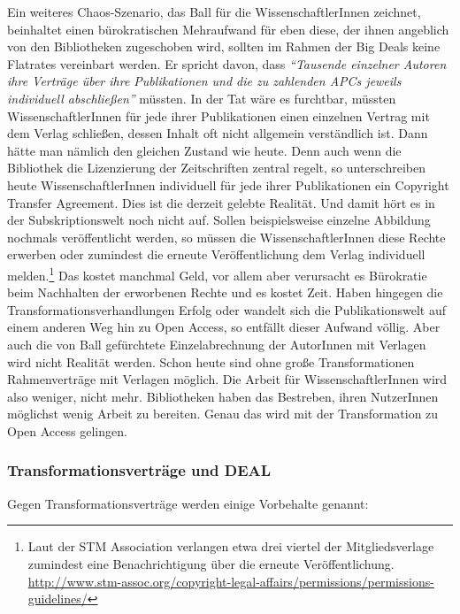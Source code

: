 \documentclass[a4paper,
fontsize=11pt,
oneside,
numbers=noperiodatend,
parskip=half-,
bibliography=totoc,
final
]{scrartcl}
\begin{document}
Ein weiteres Chaos-Szenario, das Ball für die WissenschaftlerInnen
zeichnet, beinhaltet einen bürokratischen Mehraufwand für eben diese,
der ihnen angeblich von den Bibliotheken zugeschoben wird, sollten im
Rahmen der Big Deals keine Flatrates vereinbart werden. Er spricht
davon, dass \emph{\enquote{Tausende einzelner Autoren ihre Verträge über
ihre Publikationen und die zu zahlenden APCs jeweils individuell
abschließen}} müssten. In der Tat wäre es furchtbar, müssten
WissenschaftlerInnen für jede ihrer Publikationen einen einzelnen
Vertrag mit dem Verlag schließen, dessen Inhalt oft nicht allgemein
verständlich ist. Dann hätte man nämlich den gleichen Zustand wie heute.
Denn auch wenn die Bibliothek die Lizenzierung der Zeitschriften zentral
regelt, so unterschreiben heute WissenschaftlerInnen individuell für
jede ihrer Publikationen ein Copyright Transfer Agreement. Dies ist die
derzeit gelebte Realität. Und damit hört es in der Subskriptionswelt
noch nicht auf. Sollen beispielsweise einzelne Abbildung nochmals
veröffentlicht werden, so müssen die WissenschaftlerInnen diese Rechte
erwerben oder zumindest die erneute Veröffentlichung dem Verlag
individuell melden.\footnote{Laut der STM Association verlangen etwa
  drei viertel der Mitgliedsverlage zumindest eine Benachrichtigung über
  die erneute Veröffentlichung.
  \url{http://www.stm-assoc.org/copyright-legal-affairs/permissions/permissions-guidelines/}}
Das kostet manchmal Geld, vor allem aber verursacht es Bürokratie beim
Nachhalten der erworbenen Rechte und es kostet Zeit. Haben hingegen die
Transformationsverhandlungen Erfolg oder wandelt sich die
Publikationswelt auf einem anderen Weg hin zu Open Access, so entfällt
dieser Aufwand völlig. Aber auch die von Ball gefürchtete
Einzelabrechnung der AutorInnen mit Verlagen wird nicht Realität werden.
Schon heute sind ohne große Transformationen Rahmenverträge mit Verlagen
möglich. Die Arbeit für WissenschaftlerInnen wird also weniger, nicht
mehr. Bibliotheken haben das Bestreben, ihren NutzerInnen möglichst
wenig Arbeit zu bereiten. Genau das wird mit der Transformation zu Open
Access gelingen.

\hypertarget{transformationsvertruxe4ge-und-deal}{%
\subsubsection{Transformationsverträge und
DEAL}\label{transformationsvertruxe4ge-und-deal}}

Gegen Transformationsverträge werden einige Vorbehalte genannt:
\end{document}
